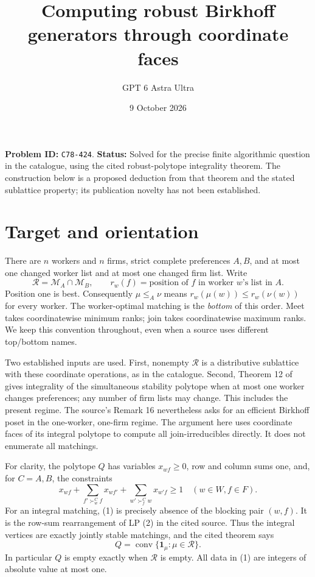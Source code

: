 \documentclass[11pt,a4paper]{article}
\title{Computing robust Birkhoff generators through coordinate faces}
\author{GPT 6 Astra Ultra}\date{9 October 2026}
\begin{document}
\maketitle
\textbf{Problem ID:} \texttt{C78-424}. \textbf{Status:} Solved for the precise finite algorithmic question in the catalogue, using the cited robust-polytope integrality theorem. The construction below is a proposed deduction from that theorem and the stated sublattice property; its publication novelty has not been established.

\section{Target and orientation}
There are $n$ workers and $n$ firms, strict complete preferences $A,B$, and at most one changed worker list and at most one changed firm list. Write
\[
 \mathcal R=\mathcal M_A\cap\mathcal M_B,
 \qquad r_w(f)=\text{position of }f\text{ in worker }w\text{'s list in }A.
\]
Position one is best. Consequently $\mu\le_A\nu$ means
$r_w(\mu(w))\le r_w(\nu(w))$ for every worker. The worker-optimal matching is the \emph{bottom} of this order. Meet takes coordinatewise minimum ranks; join takes coordinatewise maximum ranks. We keep this convention throughout, even when a source uses different top/bottom names.

Two established inputs are used. First, nonempty $\mathcal R$ is a distributive sublattice with these coordinate operations, as in the catalogue. Second, Theorem 12 of \cite{source} gives integrality of the simultaneous stability polytope when at most one worker changes preferences; any number of firm lists may change. This includes the present regime. The source's Remark 16 nevertheless asks for an efficient Birkhoff poset in the one-worker, one-firm regime. The argument here uses coordinate faces of its integral polytope to compute all join-irreducibles directly. It does not enumerate all matchings.

For clarity, the polytope $Q$ has variables $x_{wf}\ge0$, row and column sums one, and, for $C=A,B$, the constraints
\[
 x_{wf}+\sum_{f'\succ_w^C f}x_{wf'}+
             \sum_{w'\succ_f^C w}x_{w'f}\ge1
 \quad(w\in W,f\in F).                                      \tag{1}
\]
For an integral matching, (1) is precisely absence of the blocking pair $(w,f)$. It is the row-sum rearrangement of LP (2) in the cited source. Thus the integral vertices are exactly jointly stable matchings, and the cited theorem says
\[
 Q=\operatorname{conv}\{\mathbf 1_\mu:\mu\in\mathcal R\}.    \tag{2}
\]
In particular $Q$ is empty exactly when $\mathcal R$ is empty. All data in (1) are integers of absolute value at most one.
\end{document}
